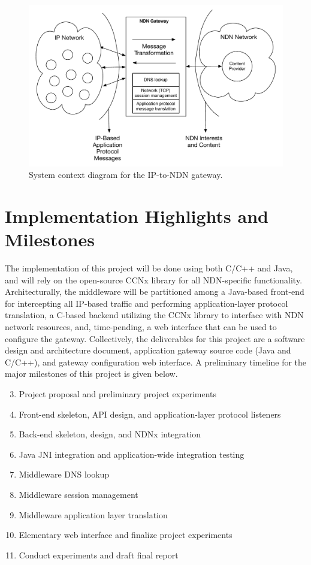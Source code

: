 \documentclass[10pt]{article}
\begin{document}
\begin{figure}
\begin{center}
\includegraphics[scale=0.5]{../sketches/gateway_highlevel.pdf}
\caption{System context diagram for the IP-to-NDN gateway.}
\end{center}
\end{figure}

\section{Implementation Highlights and Milestones}
The implementation of this project will be done using both C/C++ and Java, and will rely on the open-source CCNx \cite{ccnx} library for all NDN-specific functionality. Architecturally, the middleware will be partitioned among a Java-based front-end for intercepting all IP-based traffic and performing application-layer protocol translation, a C-based backend utilizing the CCNx library to interface with NDN network resources, and, time-pending, a web interface that can be used to configure the gateway. Collectively, the deliverables for this project are a software design and architecture document, application gateway source code (Java and C/C++), and gateway configuration web interface. A preliminary timeline for the major milestones of this project is given below.

\begin{enumerate}[{\bf Week} 1:]
	\setcounter{enumi}{2}
	\item Project proposal and preliminary project experiments
	\item Front-end skeleton, API design, and application-layer protocol listeners
	\item Back-end skeleton, design, and NDNx integration
	\item Java JNI integration and application-wide integration testing
	\item Middleware DNS lookup
	\item Middleware session management
	\item Middleware application layer translation
	\item Elementary web interface and finalize project experiments
	\item Conduct experiments and draft final report 
\end{enumerate}
\end{document}
